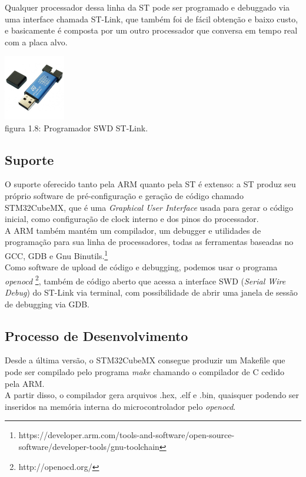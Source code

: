 \documentclass[11pt,a4paper]{report}
\begin{document}
	
	Qualquer processador dessa linha da ST pode ser programado e debuggado via uma interface chamada ST-Link, que também foi de fácil obtenção e baixo custo, e basicamente é composta por um outro processador que conversa em tempo real com a placa alvo.
	\begin{center}
	\includegraphics[width=0.2\textwidth]{stlink}\\
	\footnotesize{figura 1.8: Programador SWD ST-Link.}
	\end{center}
	
	\subsection{Suporte}
	O suporte oferecido tanto pela ARM quanto pela ST é extenso: a ST produz seu próprio software de pré-configuração e geração de código chamado STM32CubeMX, que é uma {\it Graphical User Interface} usada para gerar o código inicial, como configuração de clock interno e dos pinos do processador.\\
	
	A ARM também mantém um compilador, um debugger e utilidades de programação para sua linha de processadores, todas as ferramentas baseadas no GCC, GDB e Gnu Binutils.\footnote{https://developer.arm.com/tools-and-software/open-source-software/developer-tools/gnu-toolchain}\\
	
	Como software de upload de código e debugging, podemos usar o programa {\it openocd} \footnote{http://openocd.org/}, também de código aberto que acessa a interface SWD ({\it Serial Wire Debug}) do ST-Link via terminal, com possibilidade de abrir uma janela de sessão de debugging via GDB.
	
	\subsection{Processo de Desenvolvimento}
	Desde a última versão, o STM32CubeMX consegue produzir um Makefile que pode ser compilado pelo programa {\it make} chamando o compilador de C cedido pela ARM.\\
	
	A partir disso, o compilador gera arquivos .hex, .elf e .bin, quaisquer podendo ser inseridos na memória interna do microcontrolador pelo {\it openocd}.\\
	
\end{document}
